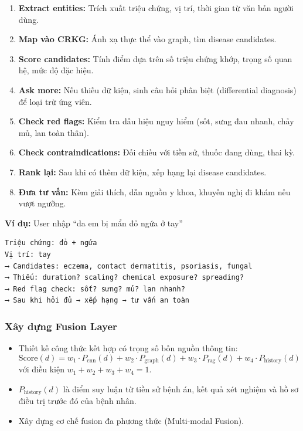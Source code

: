 \documentclass[12pt,a4paper]{article}
\begin{document}
\begin{enumerate}
    \item \textbf{Extract entities:} Trích xuất triệu chứng, vị trí, thời gian từ văn bản người dùng.
    \item \textbf{Map vào CRKG:} Ánh xạ thực thể vào graph, tìm disease candidates.
    \item \textbf{Score candidates:} Tính điểm dựa trên số triệu chứng khớp, trọng số quan hệ, mức độ đặc hiệu.
    \item \textbf{Ask more:} Nếu thiếu dữ kiện, sinh câu hỏi phân biệt (differential diagnosis) để loại trừ ứng viên.
    \item \textbf{Check red flags:} Kiểm tra dấu hiệu nguy hiểm (sốt, sưng đau nhanh, chảy mủ, lan toàn thân).
    \item \textbf{Check contraindications:} Đối chiếu với tiền sử, thuốc đang dùng, thai kỳ.
    \item \textbf{Rank lại:} Sau khi có thêm dữ kiện, xếp hạng lại disease candidates.
    \item \textbf{Đưa tư vấn:} Kèm giải thích, dẫn nguồn y khoa, khuyến nghị đi khám nếu vượt ngưỡng.
\end{enumerate}

\textbf{Ví dụ:} User nhập ``da em bị mẩn đỏ ngứa ở tay''
\begin{verbatim}
Triệu chứng: đỏ + ngứa
Vị trí: tay
⟶ Candidates: eczema, contact dermatitis, psoriasis, fungal
⟶ Thiếu: duration? scaling? chemical exposure? spreading?
⟶ Red flag check: sốt? sưng? mủ? lan nhanh?
⟶ Sau khi hỏi đủ → xếp hạng → tư vấn an toàn
\end{verbatim}

\subsubsection{Xây dựng Fusion Layer}
\begin{itemize}
    \item Thiết kế công thức kết hợp có trọng số bốn nguồn thông tin:
    \[
    \text{Score}(d) = w_1 \cdot P_{\text{cnn}}(d) + w_2 \cdot P_{\text{graph}}(d) + w_3 \cdot P_{\text{rag}}(d) + w_4 \cdot P_{\text{history}}(d)
    \]
    với điều kiện \(w_1 + w_2 + w_3 + w_4 = 1\).
    \item \(P_{\text{history}}(d)\) là điểm suy luận từ tiền sử bệnh án, kết quả xét nghiệm và hồ sơ điều trị trước đó của bệnh nhân.
    \item Xây dựng cơ chế fusion đa phương thức (Multi-modal Fusion).
\end{itemize}
\end{document}
